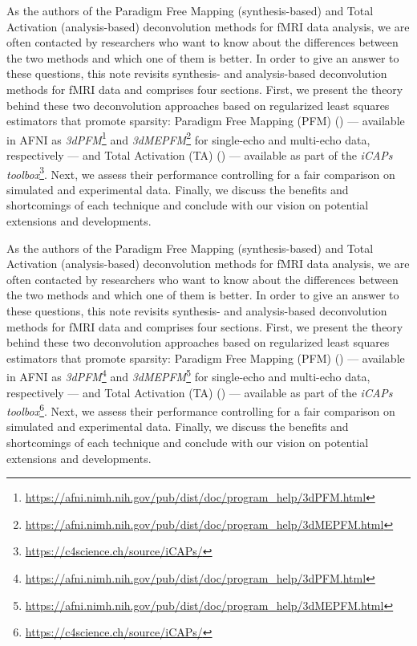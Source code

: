 As the authors of the Paradigm Free Mapping (synthesis-based) and Total Activation (analysis-based) deconvolution methods for fMRI data analysis, we are often contacted by researchers who want to know about the differences between the two methods and which one of them is better. In order to give an answer to these questions, this note revisits synthesis- and analysis-based deconvolution methods for fMRI data and comprises four sections. First, we present the theory behind these two deconvolution approaches based on regularized least squares estimators that promote sparsity: Paradigm Free Mapping (PFM) (\citealt{Gaudes2013Paradigmfreemapping}) --- available in AFNI as \textit{3dPFM}\footnote{\url{https://afni.nimh.nih.gov/pub/dist/doc/program_help/3dPFM.html}} and \textit{3dMEPFM}\footnote{\url{https://afni.nimh.nih.gov/pub/dist/doc/program_help/3dMEPFM.html}} for single-echo and multi-echo data, respectively --- and Total Activation (TA) (\citealt{Karahanoglu2013TotalactivationfMRI}) --- available as part of the \textit{iCAPs toolbox}\footnote{\url{https://c4science.ch/source/iCAPs/}}. Next, we assess their performance controlling for a fair comparison on simulated and experimental data. Finally, we discuss the benefits and shortcomings of each technique and conclude with our vision on potential extensions and developments.

As the authors of the Paradigm Free Mapping (synthesis-based) and Total Activation (analysis-based) deconvolution methods for fMRI data analysis, we are often contacted by researchers who want to know about the differences between the two methods and which one of them is better. In order to give an answer to these questions, this note revisits synthesis- and analysis-based deconvolution methods for fMRI data and comprises four sections. First, we present the theory behind these two deconvolution approaches based on regularized least squares estimators that promote sparsity: Paradigm Free Mapping (PFM) (\citealt{Gaudes2013Paradigmfreemapping}) --- available in AFNI as \textit{3dPFM}\footnote{\url{https://afni.nimh.nih.gov/pub/dist/doc/program_help/3dPFM.html}} and \textit{3dMEPFM}\footnote{\url{https://afni.nimh.nih.gov/pub/dist/doc/program_help/3dMEPFM.html}} for single-echo and multi-echo data, respectively --- and Total Activation (TA) (\citealt{Karahanoglu2013TotalactivationfMRI}) --- available as part of the \textit{iCAPs toolbox}\footnote{\url{https://c4science.ch/source/iCAPs/}}. Next, we assess their performance controlling for a fair comparison on simulated and experimental data. Finally, we discuss the benefits and shortcomings of each technique and conclude with our vision on potential extensions and developments.